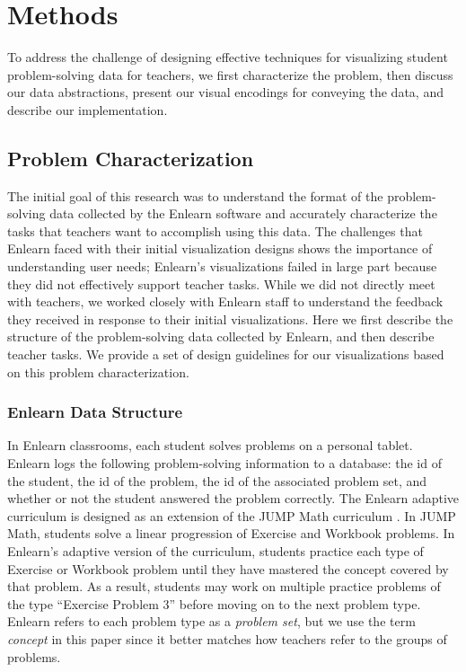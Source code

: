 \documentclass{sigchi}
\begin{document}
\section{Methods}
To address the challenge of designing effective techniques for visualizing student problem-solving data for teachers, we first characterize the problem, then discuss our data abstractions, present our visual encodings for conveying the data, and describe our implementation.


\subsection{Problem Characterization}
The initial goal of this research was to understand the format of the problem-solving data collected by the Enlearn software and accurately characterize the tasks that teachers want to accomplish using this data. The challenges that Enlearn faced with their initial visualization designs shows the importance of understanding user needs; Enlearn's visualizations failed in large part because they did not effectively support teacher tasks. While we did not directly meet with teachers, we worked closely with Enlearn staff to understand the feedback they received in response to their initial visualizations. Here we first describe the structure of the problem-solving data collected by Enlearn, and then describe teacher tasks. We provide a set of design guidelines for our visualizations based on this problem characterization.

\subsubsection{Enlearn Data Structure}
In Enlearn classrooms, each student solves problems on a personal tablet. Enlearn logs the following problem-solving information to a database: the id of the student, the id of the problem, the id of the associated problem set, and whether or not the student answered the problem correctly. The Enlearn adaptive curriculum is designed as an extension of the JUMP Math curriculum \cite{JUMPMath}. In JUMP Math, students solve a linear progression of Exercise and Workbook problems. In Enlearn's adaptive version of the curriculum, students practice each type of Exercise or Workbook problem until they have mastered the concept covered by that problem. As a result, students may work on multiple practice problems of the type ``Exercise Problem 3'' before moving on to the next problem type. Enlearn refers to each problem type as a \emph{problem set}, but we use the term \emph{concept} in this paper since it better matches how teachers refer to the groups of problems.
\end{document}
